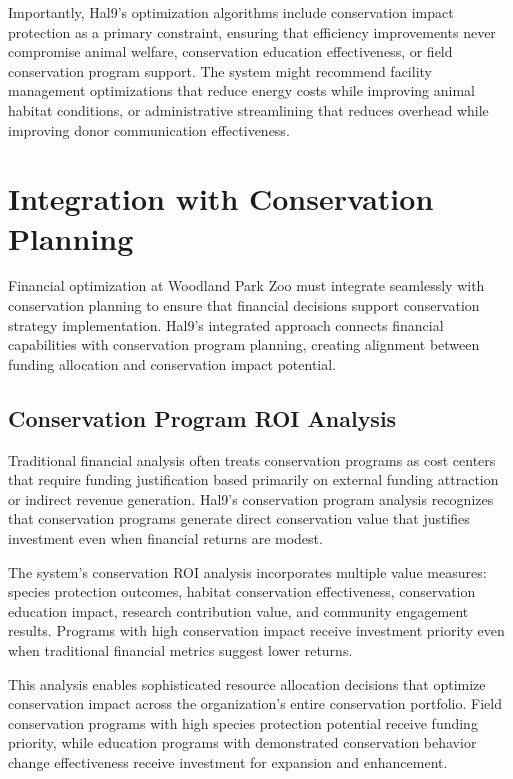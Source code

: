 \documentclass[
  Letterpaper,
]{scrbook}
\begin{document}
Importantly, Hal9's optimization algorithms include conservation impact
protection as a primary constraint, ensuring that efficiency
improvements never compromise animal welfare, conservation education
effectiveness, or field conservation program support. The system might
recommend facility management optimizations that reduce energy costs
while improving animal habitat conditions, or administrative
streamlining that reduces overhead while improving donor communication
effectiveness.

\section{Integration with Conservation
Planning}\label{integration-with-conservation-planning}

Financial optimization at Woodland Park Zoo must integrate seamlessly
with conservation planning to ensure that financial decisions support
conservation strategy implementation. Hal9's integrated approach
connects financial capabilities with conservation program planning,
creating alignment between funding allocation and conservation impact
potential.

\subsection{Conservation Program ROI
Analysis}\label{conservation-program-roi-analysis}

Traditional financial analysis often treats conservation programs as
cost centers that require funding justification based primarily on
external funding attraction or indirect revenue generation. Hal9's
conservation program analysis recognizes that conservation programs
generate direct conservation value that justifies investment even when
financial returns are modest.

The system's conservation ROI analysis incorporates multiple value
measures: species protection outcomes, habitat conservation
effectiveness, conservation education impact, research contribution
value, and community engagement results. Programs with high conservation
impact receive investment priority even when traditional financial
metrics suggest lower returns.

This analysis enables sophisticated resource allocation decisions that
optimize conservation impact across the organization's entire
conservation portfolio. Field conservation programs with high species
protection potential receive funding priority, while education programs
with demonstrated conservation behavior change effectiveness receive
investment for expansion and enhancement.
\end{document}
